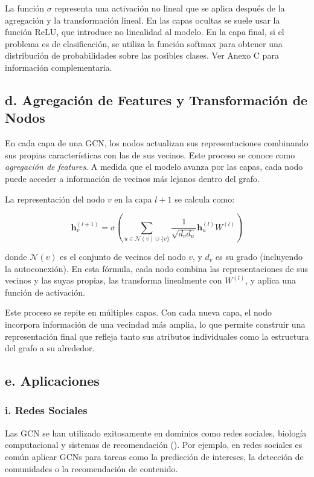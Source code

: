 \documentclass[11pt]{article} %
\begin{document}
La función $\sigma$ representa una activación no lineal que se aplica después de la agregación y la transformación lineal. En las capas ocultas se suele usar la función ReLU, que introduce no linealidad al modelo. En la capa final, si el problema es de clasificación, se utiliza la función softmax para obtener una distribución de probabilidades sobre las posibles clases. Ver Anexo C para información complementaria.

\subsection{d. Agregación de Features y Transformación de Nodos}

En cada capa de una GCN, los nodos actualizan sus representaciones combinando sus propias características con las de sus vecinos. Este proceso se conoce como \textit{agregación de features}. A medida que el modelo avanza por las capas, cada nodo puede acceder a información de vecinos más lejanos dentro del grafo.

La representación del nodo $v$ en la capa $l+1$ se calcula como:

\[
\mathbf{h}_v^{(l+1)} = \sigma \left( \sum_{u \in \mathcal{N}(v) \cup \{v\}} \frac{1}{\sqrt{d_v d_u}} \mathbf{h}_u^{(l)} W^{(l)} \right)
\]

donde $\mathcal{N}(v)$ es el conjunto de vecinos del nodo $v$, y $d_v$ es su grado (incluyendo la autoconexión). En esta fórmula, cada nodo combina las representaciones de sus vecinos y las suyas propias, las transforma linealmente con $W^{(l)}$, y aplica una función de activación.

Este proceso se repite en múltiples capas. Con cada nueva capa, el nodo incorpora información de una vecindad más amplia, lo que permite construir una representación final que refleja tanto sus atributos individuales como la estructura del grafo a su alrededor.


\subsection{e. Aplicaciones}

\subsubsection{i. Redes Sociales}

Las GCN se han utilizado exitosamente en dominios como redes sociales, biología computacional y sistemas de recomendación (\cite{zhou2020graph}). Por ejemplo, en redes sociales es común aplicar GCNs para tareas como la predicción de intereses, la detección de comunidades o la recomendación de contenido.
\end{document}
